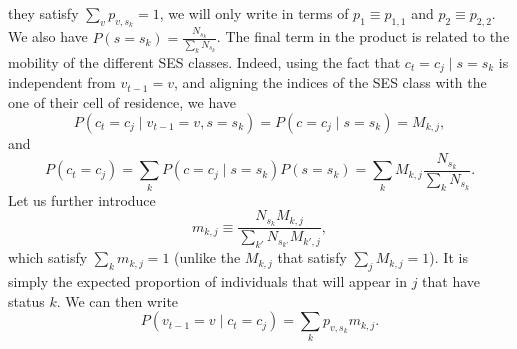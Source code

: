 \documentclass[../thesis.tex]{subfiles}
\begin{document}
they satisfy $\sum_v p_{v, s_k} = 1$, we will only write in terms of $p_1 \equiv p_{1,
1}$ and $p_2 \equiv p_{2, 2}$. We also have $P(s = s_k) = \frac{N_{s_k}}{\sum_k
N_{s_k}}$. The final term in the product is related to the mobility of the
different SES classes. Indeed, using the fact that $c_t = c_j \mid s = s_k$ is
independent from $v_{t-1} = v$, and aligning the indices of the SES class with the one
of their cell of residence, we have
\begin{equation}
\label{eq:mob_by_SES}
    P(c_t = c_j \mid v_{t-1} = v, s = s_k) = P(c = c_j \mid s = s_k) = M_{k, j},
\end{equation}
and
\begin{equation}
    P(c_t = c_j) = \sum_k P(c = c_j \mid s = s_k) P(s = s_k) = \sum_k M_{k, j} \frac{N_{s_k}}{\sum_k
    N_{s_k}}.
\end{equation}
Let us further introduce
\begin{equation}
    m_{k, j} \equiv \frac{N_{s_k} M_{k, j}}{\sum_{k'} N_{s_{k'}} M_{k', j}},
\end{equation}
which satisfy $\sum_k m_{k, j} = 1$ (unlike the $M_{k, j}$ that satisfy $\sum_j M_{k, j}
= 1$). It is simply the expected proportion of individuals that will appear in $j$ that
have status $k$. We can then write
\begin{equation}
\label{eq:decomp_prev_by_SES}
    P(v_{t-1} = v \mid c_t = c_j) = \sum_k p_{v, s_k} m_{k, j}.
\end{equation}
\end{document}
